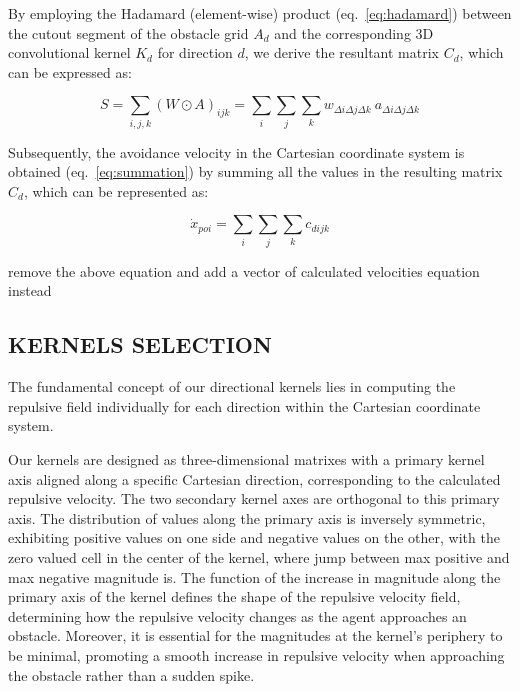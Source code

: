 \documentclass[letterpaper, 10 pt, conference]{ieeeconf}  %
\begin{document}
By employing the Hadamard (element-wise) product (eq.~\ref{eq:hadamard}) between the cutout segment of the obstacle grid \(A_d\) and the corresponding 3D convolutional kernel \(K_d\) for direction \(d\), we derive the resultant matrix \(C_d\), which can be expressed as:


\begin{equation}
	S = \sum_{i,j,k} (W \odot A)_{ijk} = \sum_{i}\sum_{j}\sum_{k} w_{\Delta i \Delta j \Delta k} ~  a_{\Delta i \Delta j \Delta k}
\end{equation}

Subsequently, the avoidance velocity in the Cartesian coordinate system is obtained (eq.~\ref{eq:summation}) by summing all the values in the resulting matrix $C_d$, which can be represented as:

\begin{equation}
	\dot{x}_{poi} = \sum_{i}\sum_{j}\sum_{k} c_{dijk} 
	\label{eq:summation}
\end{equation}

\alert{remove the above equation and add a vector of calculated velocities equation instead}




\subsection{KERNELS SELECTION}

The fundamental concept of our directional kernels lies in computing the repulsive field individually for each direction within the Cartesian coordinate system. 

Our kernels are designed as three-dimensional matrixes with a primary kernel axis aligned along a specific Cartesian direction, corresponding to the calculated repulsive velocity. The two secondary kernel axes are orthogonal to this primary axis. The distribution of values along the primary axis is inversely symmetric, exhibiting positive values on one side and negative values on the other, with the zero valued cell in the center of the kernel, where jump between max positive and max negative magnitude is. The function of the increase in magnitude along the primary axis of the kernel defines the shape of the repulsive velocity field, determining how the repulsive velocity changes as the agent approaches an obstacle. Moreover, it is essential for the magnitudes at the kernel's periphery to be minimal, promoting a smooth increase in repulsive velocity when approaching the obstacle rather than a sudden spike.
\end{document}
